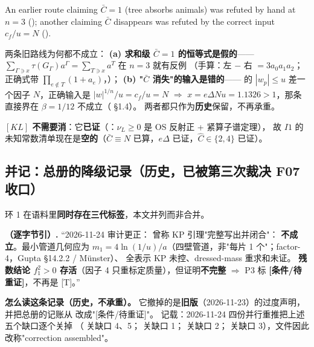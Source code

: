 \begin{quotebox}
\footnotesize
An earlier route claiming $\bar C=1$ (tree absorbs animals) was refuted by hand at $n=3$ (); another claiming $\bar C$ disappears was refuted by the correct input $c_f/u=N$ ().

\upshape\footnotesize 两条旧路线为何都不成立：
\textbf{(a) 求和级 $\bar C=1$ 的恒等式是假的}——$\sum_{\Gamma\ni x}\tau(G_\Gamma)a^\Gamma=\sum_{T\ni x}a^T$ 在 $n=3$ 就有反例
（手算：左 $-$ 右 $=3a_0a_1a_2$；正确式带 $\prod_{e\notin T}(1+a_e)$，）；
\textbf{(b) "$\bar C$ 消失"的输入是错的}—— 的 $|w_p|\le u$ 差一个因子 $N$，正确输入是 $|w|^{1/n}/u=c_f/u=N$
$\Rightarrow$ $x=e\Delta Nu=1.1326>1$，那条直接界在 $\beta=1/12$ 不成立（ \S1.4）。
两者都只作为\textbf{历史}保留，不再承重。
\end{quotebox}

\textbf{$[KL]$ 不需要消}：它\textbf{已证}（：$\nu_L\ge0$ 是 OS 反射正 + 紧算子谱定理），
故 $I1$ 的未知常数清单现在是\textbf{空的}（$\bar C\equiv N$ 已算，$e\Delta$ 已证，$\hat C\in\{2,4\}$ 已证）。


\subsection{并记：总册的降级记录（历史，已被第三次裁决 F07 收口）}

环 1 在语料里\textbf{同时存在三代标签}，本文并列而非合并。

\begin{quotebox}
\textbf{（逐字节引）.}
``2026-11-24 审计更正： 曾称 KP 引理"完整写出并闭合"：
\textbf{不成立}。最小管道几何应为 $m_1=4\ln(1/u)/a$（四壁管道，非"每片 1 个"；factor-4，Gupta \S14.2.2 / Münster）、
全表示 KP 未控、dressed-mass 重求和未证。
\textbf{残数结论 $f_1^2>0$ 存活}（因子 4 只重标定质量），但证明\textbf{不完整} $\Rightarrow$ P3 标 \textbf{[条件/待重证]}，不再是 [T]。''
\end{quotebox}

\textbf{怎么读这条记录（历史，不承重）。} 它撤掉的是\textbf{旧版}（2026-11-23）的过度声明，并把总册的记账从 \LT{} 改成"[条件/待重证]"。
 记载：2026-11-24 四份并行重推把上述五个缺口逐个关掉
（ 关缺口 4、5； 关缺口 1； 关缺口 2；
 关缺口 3），文件因此改称"correction assembled"。\LM

